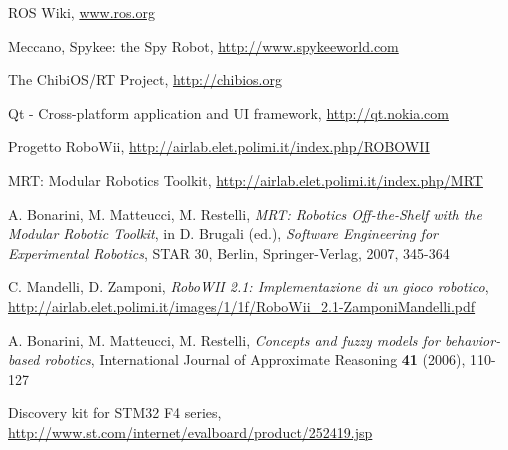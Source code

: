 \begin{thebibliography}{9}

  ROS Wiki, \url{www.ros.org}

  Meccano, Spykee: the Spy Robot, \url{http://www.spykeeworld.com}

  The ChibiOS/RT Project, \url{http://chibios.org}

	Qt - Cross-platform application and UI framework, \url{http://qt.nokia.com}

  Progetto RoboWii, \url{http://airlab.elet.polimi.it/index.php/ROBOWII}

  MRT: Modular Robotics Toolkit, \url{http://airlab.elet.polimi.it/index.php/MRT}

  A. Bonarini, M. Matteucci, M. Restelli, \emph{MRT: Robotics Off-the-Shelf with the Modular Robotic Toolkit},
  in D. Brugali (ed.), \emph{Software Engineering for Experimental Robotics}, STAR 30, Berlin, Springer-Verlag, 2007, 345-364

  C. Mandelli, D. Zamponi, \emph{RoboWII 2.1: Implementazione di un gioco robotico}, \url{http://airlab.elet.polimi.it/images/1/1f/RoboWii_2.1-ZamponiMandelli.pdf}

  A. Bonarini, M. Matteucci, M. Restelli, \emph{Concepts and fuzzy models for behavior-based robotics}, International Journal of Approximate Reasoning \textbf{41} (2006), 110-127

  Discovery kit for STM32 F4 series, \url{http://www.st.com/internet/evalboard/product/252419.jsp}

\end{thebibliography}
